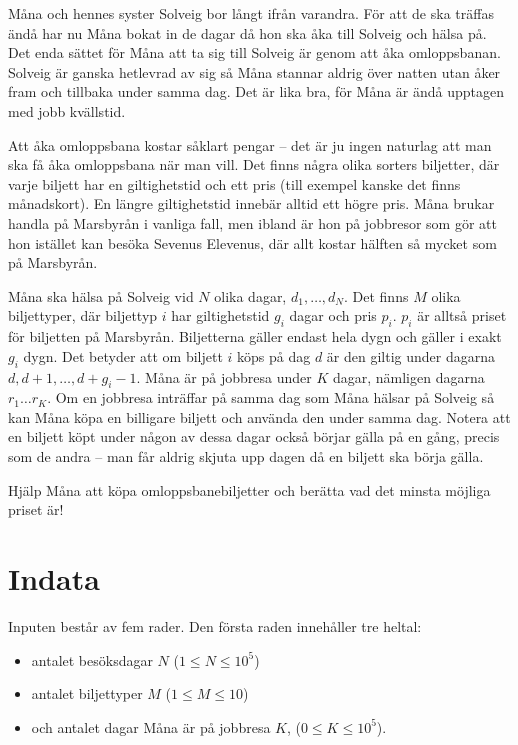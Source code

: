 \def\version{jury-2}
\noindent
Måna och hennes syster Solveig bor långt ifrån varandra.
För att de ska träffas ändå har nu Måna bokat in de dagar då hon ska åka till Solveig och hälsa på.
Det enda sättet för Måna att ta sig till Solveig är genom att åka omloppsbanan.
Solveig är ganska hetlevrad av sig så Måna stannar aldrig över natten utan åker fram och tillbaka under samma dag.
Det är lika bra, för Måna är ändå upptagen med jobb kvällstid.

Att åka omloppsbana kostar såklart pengar -- det är ju ingen naturlag att man ska få åka omloppsbana när man vill.
Det finns några olika sorters biljetter, där varje biljett har en giltighetstid och ett pris (till exempel kanske det finns månadskort).
En längre giltighetstid innebär alltid ett högre pris.
Måna brukar handla på Marsbyrån i vanliga fall, men ibland är hon på jobbresor som gör att hon istället kan besöka Sevenus Elevenus, där allt kostar hälften så mycket som på Marsbyrån.

Måna ska hälsa på Solveig vid $N$ olika dagar, $d_1, \dots, d_N$.
Det finns $M$ olika biljettyper, där biljettyp $i$ har giltighetstid $g_i$ dagar och pris $p_i$. $p_i$ är alltså priset för biljetten på Marsbyrån.
Biljetterna gäller endast hela dygn och gäller i exakt $g_i$ dygn.
Det betyder att om biljett $i$ köps på dag $d$ är den giltig under dagarna $d,d+1,\ldots,d+g_i-1$.
Måna är på jobbresa under $K$ dagar, nämligen dagarna $r_1 \dots r_K$.
Om en jobbresa inträffar på samma dag som Måna hälsar på Solveig så kan Måna köpa en billigare biljett och använda den under samma dag.
Notera att en biljett köpt under någon av dessa dagar också börjar gälla på en gång, precis som de andra -- man får aldrig skjuta upp dagen då en biljett ska börja gälla.

Hjälp Måna att köpa omloppsbanebiljetter och berätta vad det minsta möjliga priset är! 

\section*{Indata}
Inputen består av fem rader.
Den första raden innehåller tre heltal:
\begin{itemize}
        \item antalet besöksdagar $N$ ($1\leq N\leq 10^5$)
        \item antalet biljettyper $M$ ($1\leq M\leq 10$)
        \item och antalet dagar Måna är på jobbresa $K$, ($0\leq K\leq 10^5$).
\end{itemize}

